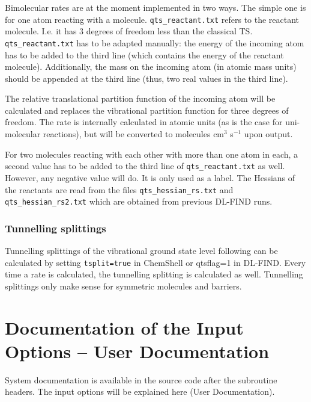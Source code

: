 \documentclass{article}
\begin{document}
Bimolecular rates are at the moment implemented in two ways. The simple one is
for one atom reacting with a molecule. \texttt{qts\_reactant.txt} refers to
the reactant molecule. I.e. it has 3 degrees of freedom less than the
classical TS. \texttt{qts\_reactant.txt} has to be adapted manually: the
energy of the incoming atom has to be added to the third line (which contains
the energy of the reactant molecule). Additionally, the mass on the incoming
atom (in atomic mass units) should be appended at the third line (thus, two
real values in the third line).

The relative translational partition function of the incoming atom will be
calculated and replaces the vibrational partition function for three degrees
of freedom. The rate is internally calculated in atomic units (as is the case
for uni-molecular reactions), but will be converted to molecules cm$^3$
s$^{-1}$ upon output.

For two molecules reacting with each other with more than one atom in each, a
second value has to be added to the third line of \texttt{qts\_reactant.txt}
as well. However, any negative value will do. It is only used as a label. The
Hessians of the reactants are read from the files
\texttt{qts\_hessian\_rs.txt} and \texttt{qts\_hessian\_rs2.txt} which are
obtained from previous DL-FIND runs. 

\subsubsection{Tunnelling splittings}

Tunnelling splittings of the vibrational ground state level following
\cite{ric11} can be calculated by setting \texttt{tsplit=true} in ChemShell or
qtsflag=1 in DL-FIND. Every time a rate is calculated, the tunnelling splitting
is calculated as well. Tunnelling splittings only make sense for
symmetric molecules and barriers.

\newpage
\clearpage
\section{Documentation of the Input Options -- User Documentation}

System documentation is available in the source code after the subroutine
headers. The input options will be explained here (User Documentation).
\end{document}
